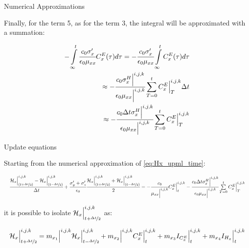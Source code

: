 \documentclass[aspectratio=169]{beamer}
\begin{document}
\begin{frame}{Numerical Approximations}
  
  Finally, for the term 5, as for the term 3, the integral will be approximated with a summation:

  \begin{align}
      - \int\limits_{\infty}^t\cfrac{c_0\sigma_x^{\prime}}{\epsilon_0\mu_{xx}}C_x^E(\tau)d\tau = - \cfrac{c_0\sigma_x^{\prime}}{\epsilon_0\mu_{xx}} \int\limits_{\infty}^tC_x^E(\tau)d\tau \nonumber \\
      \approx - \cfrac{c_0\sigma_x^H\Big|^{i,j,k}}{\epsilon_0\mu_{xx}\Big|^{i,j,k}} \sum\limits_{T=0}^{t}C_x^E\Big|^{i,j,k}_{T}\Delta t \nonumber \\
      \approx - \cfrac{c_0\Delta t\sigma_x^H\Big|^{i,j,k}}{\epsilon_0\mu_{xx}\Big|^{i,j,k}} \sum\limits_{T=0}^{t}C_x^E\Big|^{i,j,k}_{T}
  \end{align}

\end{frame}

\begin{frame}{Update equations}
  
  Starting from the numerical approximation of \eqref{eq:Hx_upml_time}:

  \begin{align*}
    \resizebox{\hsize}{!}{$
      \cfrac{\Hht_x\Big|_{(t+\nicefrac{\dt}{2})}^{i,j,k}-\Hht_x\Big|^{i,j,k}_{(t-\nicefrac{\dt}{2})}}{\dt}
      + \cfrac{\sigma_y\Prime + \sigma_z\Prime}{\epsilon_0}\cfrac{\Hht_x\Big|_{(t+\nicefrac{\dt}{2})}^{i,j,k}+\Hht_x\Big|^{i,j,k}_{(t-\nicefrac{\dt}{2})}}{2}
      = -\cfrac{c_0}{\mu_{xx}\Big|^{i,j,k}}\CEx\Big|^{i,j,k}_{t} - \cfrac{c_0\dt\sigma_x^H\Big|^{i,j,k}}{\epsilon_0\mu_{xx}\Big|^{i,j,k}} \sum\limits_{T=0}^{t}\CEx\Big|^{i,j,k}_{T}
    $}
  \end{align*}

  it is possible to isolate $ \mathcal{H}_x\Big|_{t+\nicefrac{\Delta t}{2}}^{i,j,k}$ as:

  \begin{align}
    \resizebox{\hsize}{!}{$
      \Hht_x\Big|_{t+\nicefrac{\dt}{2}}^{i,j,k} = \mxone\Big|^{i,j,k} \Hht_x\Big|_{t-\nicefrac{\dt}{2}}^{i,j,k} 
      + \mxtwo\Big|^{i,j,k}\CEx\Big|^{i,j,k}_{t} + \mxthree \ICEx\Big|^{i,j,k}_{t} 
      + \mxfour \IHx\Big|^{i,j,k}_{t}
    $}
  \end{align}

\end{frame}
\end{document}
